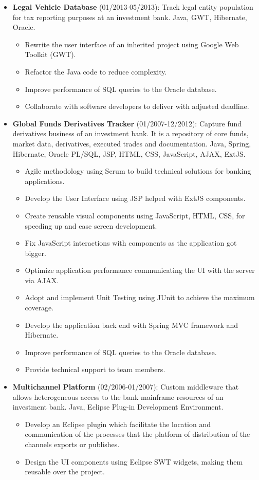 \documentclass[10pt,a4paper,sans]{moderncv}   %
\begin{document}
{\begin{itemize}
    \item \textbf{Legal Vehicle Database} (01/2013-05/2013): Track legal entity population for tax reporting purposes at an investment bank. Java, GWT, Hibernate, Oracle.
    \begin{itemize}%
        \item Rewrite the user interface of an inherited project using Google Web Toolkit (GWT).
        \item Refactor the Java code to reduce complexity.
        \item Improve performance of SQL queries to the Oracle database.
        \item Collaborate with software developers to deliver with adjusted deadline.
    \end{itemize}
    \item \textbf{Global Funds Derivatives Tracker} (01/2007-12/2012): Capture fund derivatives business of an investment bank. It is a repository of core funds, market data, derivatives, executed trades and documentation. Java, Spring, Hibernate, Oracle PL/SQL, JSP, HTML, CSS, JavaScript, AJAX, ExtJS.
    \begin{itemize}%
        \item Agile methodology using Scrum to build technical solutions for banking applications.
        \item Develop the User Interface using JSP helped with ExtJS components.
        \item Create reusable visual components using JavaScript, HTML, CSS, for speeding up and ease screen development.
        \item Fix JavaScript interactions with components as the application got bigger.
        \item Optimize application performance communicating the UI with the server via AJAX.
        \item Adopt and implement Unit Testing using JUnit to achieve the maximum coverage.
        \item Develop the application back end with Spring MVC framework and Hibernate.
        \item Improve performance of SQL queries to the Oracle database.
        \item Provide technical support to team members.
    \end{itemize}
    \item \textbf{Multichannel Platform} (02/2006-01/2007): Custom middleware that allows heterogeneous access to the bank mainframe resources of an investment bank. Java, Eclipse Plug-in Development Environment.
    \begin{itemize}%
        \item Develop an Eclipse plugin which facilitate the location and communication of the processes that the platform of distribution of the channels exports or publishes.
        \item Design the UI components using Eclipse SWT widgets, making them reusable over the project.
    \end{itemize}
\end{itemize}
}
\end{document}
